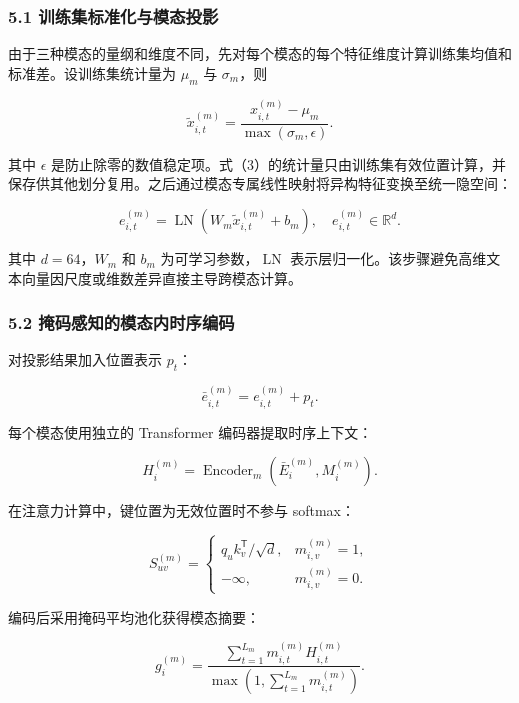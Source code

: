\documentclass[
  12pt,
  a4paper,
]{ctexart}
\begin{document}
\hypertarget{ux8badux7ec3ux96c6ux6807ux51c6ux5316ux4e0eux6a21ux6001ux6295ux5f71}{%
\subsubsection{5.1
训练集标准化与模态投影}\label{ux8badux7ec3ux96c6ux6807ux51c6ux5316ux4e0eux6a21ux6001ux6295ux5f71}}

由于三种模态的量纲和维度不同，先对每个模态的每个特征维度计算训练集均值和标准差。设训练集统计量为
\(\mu_m\) 与 \(\sigma_m\)，则

\[
\widetilde x_{i,t}^{(m)}=
\frac{x_{i,t}^{(m)}-\mu_m}{\max(\sigma_m,\epsilon)}.
\tag{3}
\]

其中 \(\epsilon\)
是防止除零的数值稳定项。式（3）的统计量只由训练集有效位置计算，并保存供其他划分复用。之后通过模态专属线性映射将异构特征变换至统一隐空间：

\[
e_{i,t}^{(m)}=\operatorname{LN}\left(W_m\widetilde x_{i,t}^{(m)}+b_m\right),
\quad e_{i,t}^{(m)}\in\mathbb{R}^{d}.
\tag{4}
\]

其中 \(d=64\)，\(W_m\) 和 \(b_m\) 为可学习参数，\(\operatorname{LN}\)
表示层归一化。该步骤避免高维文本向量因尺度或维数差异直接主导跨模态计算。

\hypertarget{ux63a9ux7801ux611fux77e5ux7684ux6a21ux6001ux5185ux65f6ux5e8fux7f16ux7801}{%
\subsubsection{5.2
掩码感知的模态内时序编码}\label{ux63a9ux7801ux611fux77e5ux7684ux6a21ux6001ux5185ux65f6ux5e8fux7f16ux7801}}

对投影结果加入位置表示 \(p_t\)：

\[
\bar e_{i,t}^{(m)}=e_{i,t}^{(m)}+p_t.
\tag{5}
\]

每个模态使用独立的 Transformer 编码器提取时序上下文：

\[
H_i^{(m)}=\operatorname{Encoder}_m\left(\bar E_i^{(m)},M_i^{(m)}\right).
\tag{6}
\]

在注意力计算中，键位置为无效位置时不参与 softmax：

\[
S_{uv}^{(m)}=
\begin{cases}
q_u k_v^{\mathsf T}/\sqrt d,&m_{i,v}^{(m)}=1,\\
-\infty,&m_{i,v}^{(m)}=0.
\end{cases}
\tag{7}
\]

编码后采用掩码平均池化获得模态摘要：

\[
g_i^{(m)}=
\frac{\sum_{t=1}^{L_m}m_{i,t}^{(m)}H_{i,t}^{(m)}}
{\max\left(1,\sum_{t=1}^{L_m}m_{i,t}^{(m)}\right)}.
\tag{8}
\]
\end{document}
